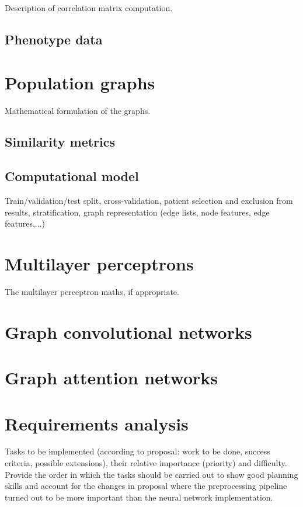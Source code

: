 \documentclass[12pt,a4paper,twoside, openright, hidelinks]{report}
\begin{document}
Description of correlation matrix computation.

\subsection{Phenotype data}

\section{Population graphs}
Mathematical formulation of the graphs.

\subsection{Similarity metrics}

\subsection{Computational model}
Train/validation/test split, cross-validation, patient selection and exclusion from results, stratification, graph representation (edge lists, node features, edge features,...)

\section{Multilayer perceptrons}
The multilayer perceptron maths, if appropriate.

\section{Graph convolutional networks}

\section{Graph attention networks}

\section{Requirements analysis}

Tasks to be implemented (according to proposal: work to be done, success criteria, possible extensions), their relative importance (priority) and difficulty. Provide the order in which the tasks should be carried out to show good planning skills and account for the changes in proposal where the preprocessing pipeline turned out to be more important than the neural network implementation.
\end{document}
